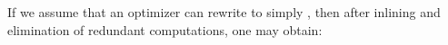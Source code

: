 If we assume that an optimizer can rewrite 
to simply , then
after inlining and elimination of redundant
computations, one may obtain:
